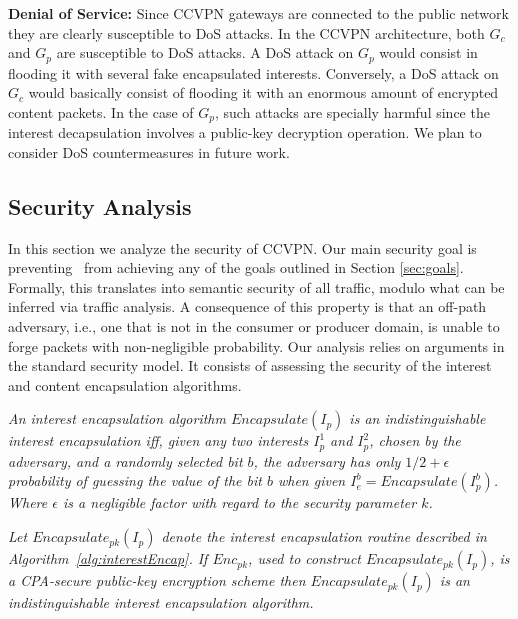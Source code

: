 \textbf{Denial of Service:} Since CCVPN gateways are connected to the public network they are
clearly susceptible to DoS attacks. In the CCVPN architecture, both $G_c$ and $G_p$ are
susceptible to DoS attacks. A DoS attack on $G_p$ would consist in flooding it with several
fake encapsulated interests. Conversely, a DoS attack on $G_c$ would basically consist
of flooding it with an enormous amount of encrypted content packets. In the case of $G_p$,
such attacks are specially harmful since the interest decapsulation involves a public-key
decryption operation. We plan to consider DoS countermeasures in future work.

\subsection{Security Analysis}

In this section we analyze the security of CCVPN. Our main security goal is
preventing \adv\ from achieving any of the goals outlined in Section \ref{sec:goals}.
Formally, this translates into semantic security of all traffic, modulo what can be inferred via traffic analysis.
A consequence of this property is that an off-path adversary, i.e., one that is
not in the consumer or producer domain, is unable to forge packets with
non-negligible probability. Our analysis relies on arguments in the standard
security model. It consists of assessing the security of the interest and
content encapsulation algorithms.

\begin{definition}\label{def1}
\textit{
An interest encapsulation algorithm $Encapsulate(I_p)$ is an indistinguishable
interest encapsulation iff, given any two interests $I_p^1$ and $I_p^2$, chosen
by the adversary, and a randomly selected bit $b$, the adversary has only $1/2 + \epsilon$
probability of guessing the value of the bit $b$ when given $I_e^b = Encapsulate(I_p^b)$.
Where $\epsilon$ is a negligible factor with regard to the security parameter $k$.
}
\end{definition}

\begin{theorem}\label{theo1}
\textit{
Let $Encapsulate_{pk}(I_p)$ denote the interest encapsulation routine described in
Algorithm~\ref{alg:interestEncap}. If $Enc_{pk}$, used to construct $Encapsulate_{pk}(I_p)$,
is a CPA-secure public-key encryption scheme then $Encapsulate_{pk}(I_p)$ is an
indistinguishable interest encapsulation algorithm.
}
\end{theorem}

